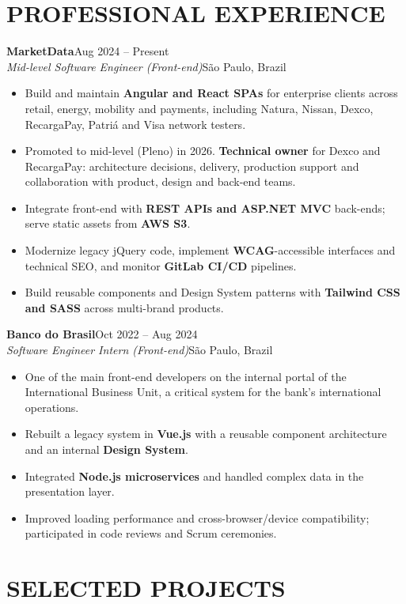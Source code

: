 ﻿\documentclass[10pt,a4paper]{article}
\newcommand{\role}[4]{%
  \textbf{#1}\hfill #2\\[1pt]
  \textit{#3}\hfill #4\par\vspace{1.5pt}
}
\begin{document}
\section*{PROFESSIONAL EXPERIENCE}

\role{MarketData}{Aug 2024 -- Present}{Mid-level Software Engineer (Front-end)}{S\~ao Paulo, Brazil}
\begin{itemize}
  \item Build and maintain \textbf{Angular and React SPAs} for enterprise clients across retail, energy, mobility and payments, including Natura, Nissan, Dexco, RecargaPay, Patri\'a and Visa network testers.
  \item Promoted to mid-level (Pleno) in 2026. \textbf{Technical owner} for Dexco and RecargaPay: architecture decisions, delivery, production support and collaboration with product, design and back-end teams.
  \item Integrate front-end with \textbf{REST APIs and ASP.NET MVC} back-ends; serve static assets from \textbf{AWS S3}.
  \item Modernize legacy jQuery code, implement \textbf{WCAG}-accessible interfaces and technical SEO, and monitor \textbf{GitLab CI/CD} pipelines.
  \item Build reusable components and Design System patterns with \textbf{Tailwind CSS and SASS} across multi-brand products.
\end{itemize}

\role{Banco do Brasil}{Oct 2022 -- Aug 2024}{Software Engineer Intern (Front-end)}{S\~ao Paulo, Brazil}
\begin{itemize}
  \item One of the main front-end developers on the internal portal of the International Business Unit, a critical system for the bank's international operations.
  \item Rebuilt a legacy system in \textbf{Vue.js} with a reusable component architecture and an internal \textbf{Design System}.
  \item Integrated \textbf{Node.js microservices} and handled complex data in the presentation layer.
  \item Improved loading performance and cross-browser/device compatibility; participated in code reviews and Scrum ceremonies.
\end{itemize}

\section*{SELECTED PROJECTS}
\end{document}
